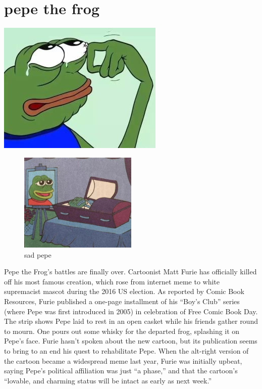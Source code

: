 
\section{pepe the frog}
\includegraphics[width=.9\textwidth]{frog/image/frog.jpg}
\begin{figure}
\begin{center}
\includegraphics[width=0.5\textwidth]{frog/image/frog2.jpg} %
\end{center}
\caption{sad pepe}
\label{figurezzzz}
\end{figure}
Pepe the Frog’s battles are finally over. Cartoonist Matt Furie has officially killed off his most famous creation, which rose from internet meme to white supremacist mascot during the 2016 US election. As reported by Comic Book Resources, Furie published a one-page installment of his “Boy’s Club” series (where Pepe was first introduced in 2005) in celebration of Free Comic Book Day. The strip shows Pepe laid to rest in an open casket while his friends gather round to mourn. One pours out some whisky for the departed frog, splashing it on Pepe’s face. 
Furie hasn’t spoken about the new cartoon, but its publication seems to bring to an end his quest to rehabilitate Pepe. When the alt-right version of the cartoon became a widespread meme last year, Furie was initially upbeat, saying Pepe’s political affiliation was just “a phase,” and that the cartoon’s “lovable, and charming status will be intact as early as next week.” 
